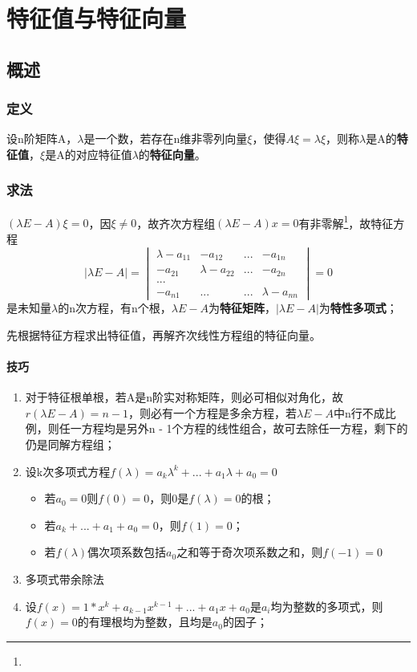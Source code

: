 
\chapter{特征值与特征向量}

\section{概述}

\subsection{定义}
设n阶矩阵A，\(\lambda\)是一个数，若存在n维非零列向量\(\xi\)，使得\(A\xi = \lambda\xi\)，则称\(\lambda\)是A的\textbf{特征值}，\(\xi\)是A的对应特征值\(\lambda\)的\textbf{特征向量}。

\subsection{求法}
\((\lambda E - A)\xi = 0\)，因\(\xi \neq 0\)，故齐次方程组\((\lambda E - A)x = 0\)有非零解\footnote[1]{\mymatrix}，故特征方程\[|\lambda E - A| = \begin{vmatrix}
\lambda - a_{11} & -a_{12} & ... & -a_{1n} \\ 
-a_{21} & \lambda - a_{22} & ... & -a_{2n} \\
... \\ 
-a_{n1} & ... & ... & \lambda - a_{nn}
\end{vmatrix} = 0\]是未知量\(\lambda\)的n次方程，有n个根，\(\lambda E - A\)为\textbf{特征矩阵}，\(|\lambda E - A|\)为\textbf{特性多项式}；

先根据特征方程求出特征值，再解齐次线性方程组的特征向量。

\subsubsection{技巧}
\begin{enumerate}
    \item 对于特征根单根，若A是n阶实对称矩阵，则必可相似对角化，故\(r(\lambda E - A) = n - 1\)，则必有一个方程是多余方程，若\(\lambda E - A\)中n行不成比例，则任一方程均是另外n - 1个方程的线性组合，故可去除任一方程，剩下的仍是同解方程组；
    \item 设k次多项式方程\(f(\lambda) = a_k\lambda^k + ... + a_1\lambda + a_0 = 0\)\begin{itemize}
        \item 若\(a_0 = 0\)则\(f(0) = 0\)，则0是\(f(\lambda) = 0\)的根；
        \item 若\(a_k + ... + a_1 + a_0 = 0\)，则\(f(1) = 0\)；
        \item 若\(f(\lambda)\)偶次项系数包括\(a_0\)之和等于奇次项系数之和，则\(f(-1) = 0\)
    \end{itemize}
    \item 多项式带余除法
    \item 设\(f(x) = 1 * x^k + a_{k - 1}x^{k - 1} + ... + a_1x + a_0\)是\(a_i\)均为整数的多项式，则\(f(x) = 0\)的有理根均为整数，且均是\(a_0\)的因子；
\end{enumerate}


